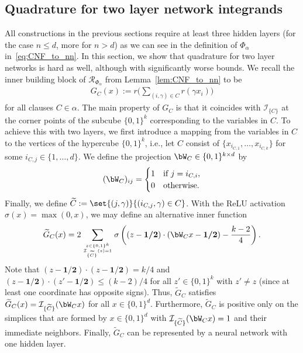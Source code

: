 \documentclass{amsart}[11pt]
\numberwithin{equation}{section}
\newcommand{\realization}{\mathcal{R}}
\newcommand{\interpretation}{\mathcal{I}}
\numberwithin{theorem}{section}
\begin{document}
\subsection{Quadrature for two layer network integrands}
All constructions in the previous sections require at least three hidden layers (for the case $n\leq d$, more for $n>d$) as we can see in the definition of $\Phi_\alpha$ in~\eqref{eq:CNF_to_nn}. In this section, we show that quadrature for two layer networks is hard as well, although with significantly worse bounds.
We recall the inner building block of $\realization_{\Phi_\alpha}$ from Lemma~\ref{lem:CNF_to_nn} to be
\begin{align*}
G_C(x):=r\Big(\sum_{(i, \gamma) \in C} r(\gamma x_i)\Big) 
\end{align*}
for all clauses $C\in\alpha$. The main property of $G_C$ is that it coincides with $\interpretation_{\{C\}}$ at the corner points of the subcube $\{0,1\}^k$ corresponding to the variables in $C$. To achieve this with two layers, we first introduce a mapping from the variables in $C$ to the vertices of the hypercube $\{0,1\}^k$, i.e., let $C$ consist of $\{x_{i_{C,1}},\ldots,x_{i_{C,k}}\}$ for some $i_{C,j}\in\{1,\ldots,d\}$. We define the projection $\bW_C\in \{0,1\}^{k\times d}$ by
\begin{align*}
(\bW_C)_{ij}=\begin{cases}
1 & \text{if } j= i_{C,i},\\
0 & \text{otherwise}.
\end{cases}
\end{align*}
Finally, we define $\widetilde C:=\set{(j,\gamma)}{(i_{C,j},\gamma)\in C}$. With the ReLU activation $\sigma(x) = \max(0, x)$, we may define an alternative inner function
\begin{align*}
\widetilde G_C(x)= 2 \sum_{z\in \{0,1\}^k\atop \interpretation_{\{\widetilde C\}}(z)=1} \sigma\left((z-\boldsymbol{1/2})\cdot (\bW_C x-\boldsymbol{1/2})-\frac{k-2}{4}\right).
\end{align*}
Note that $(z-\boldsymbol{1/2})\cdot (z-\boldsymbol{1/2}) =k/4$ and $(z-\boldsymbol{1/2})\cdot (z'-\boldsymbol{1/2}) \leq (k-2)/4$ for all $z'\in\{0,1\}^k$ with $z'\neq z$ (since at least one coordinate has opposite signs). Thus, $\widetilde G_C$ satisfies $\widetilde G_C(x) = \interpretation_{\{\widetilde C\}}(\bW_C x)$ for all $x \in \{0,1\}^d$. Furthermore, $\widetilde G_C$ is positive only on the simplices that are formed by $x \in\{0,1\}^d$ with $\interpretation_{\{\widetilde C\}}(\bW_C x)=1$ and their immediate neighbors. Finally, $\widetilde G_C$ can be represented by a neural network with one hidden layer.
\end{document}
